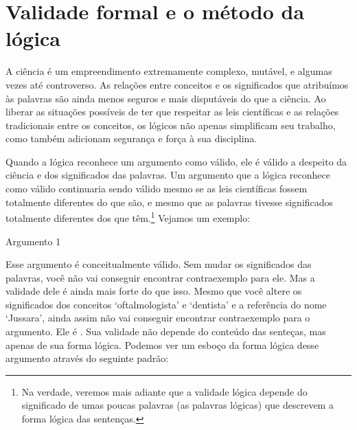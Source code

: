 \section{Validade formal e o método da lógica}
A ciência é um empreendimento extremamente complexo, mutável, e algumas vezes até controverso. As relações entre conceitos e os significados que atribuímos às palavras são ainda menos seguros e mais disputáveis do que a ciência.
Ao liberar as situações possíveis de ter que respeitar as leis científicas e as relações tradicionais entre os conceitos, os lógicos não apenas simplificam seu trabalho, como também adicionam segurança e força à sua disciplina.

Quando a lógica reconhece um argumento como válido, ele é válido a despeito da ciência e dos significados das palavras.
Um argumento que a lógica reconhece como válido continuaria sendo válido mesmo se as leis científicas fossem totalmente diferentes do que são, e mesmo que as palavras tivesse significados totalmente diferentes dos que têm.\footnote{
	Na verdade, veremos mais adiante que a validade lógica depende do significado de umas poucas palavras (as palavras lógicas) que descrevem a forma lógica das sentenças.}
Vejamos um exemplo:
\begin{description}
\item[Argumento 1]
\end{description}
Esse argumento é conceitualmente válido.
Sem mudar os significados das palavras, você não vai conseguir encontrar contraexemplo para ele.
Mas a validade dele é ainda mais forte do que isso.
Mesmo que você altere os significados dos conceitos `oftalmologista' e `dentista' e a referência do nome `Jussara', ainda assim não vai conseguir encontrar contraexemplo para o argumento.
Ele é .
Sua validade não depende do conteúdo das senteças, mas apenas de sua forma lógica.
Podemos ver um esboço da forma lógica desse argumento através do seguinte padrão:


